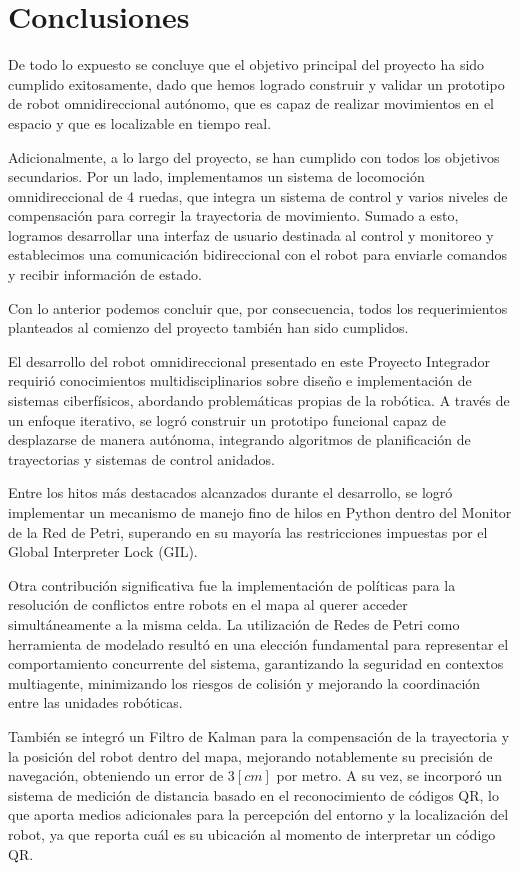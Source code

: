 \chapter{Conclusiones}

De todo lo expuesto se concluye que el objetivo principal del proyecto ha sido cumplido exitosamente, dado que hemos logrado construir y validar un prototipo de robot omnidireccional autónomo, que es capaz de realizar movimientos en el espacio y que es localizable en tiempo real.

Adicionalmente, a lo largo del proyecto, se han cumplido con todos los objetivos secundarios. Por un lado, implementamos un sistema de locomoción omnidireccional de 4 ruedas, que integra un sistema de control y varios niveles de compensación para corregir la trayectoria de movimiento. Sumado a esto, logramos desarrollar una interfaz de usuario destinada al control y monitoreo y establecimos una comunicación bidireccional con el robot para enviarle comandos y recibir información de estado.

Con lo anterior podemos concluir que, por consecuencia, todos los requerimientos planteados al comienzo del proyecto también han sido cumplidos.

El desarrollo del robot omnidireccional presentado en este Proyecto Integrador requirió conocimientos multidisciplinarios sobre diseño e implementación de sistemas ciberfísicos, abordando problemáticas propias de la robótica. A través de un enfoque iterativo, se logró construir un prototipo funcional capaz de desplazarse de manera autónoma, integrando algoritmos de planificación de trayectorias y sistemas de control anidados.

Entre los hitos más destacados alcanzados durante el desarrollo, se logró implementar un mecanismo de manejo fino de hilos en Python dentro del Monitor de la Red de Petri, superando en su mayoría las restricciones impuestas por el Global Interpreter Lock (GIL).

Otra contribución significativa fue la implementación de políticas para la resolución de conflictos entre robots en el mapa al querer acceder simultáneamente a la misma celda. La utilización de Redes de Petri como herramienta de modelado resultó en una elección fundamental para representar el comportamiento concurrente del sistema, garantizando la seguridad en contextos multiagente, minimizando los riesgos de colisión y mejorando la coordinación entre las unidades robóticas.

También se integró un Filtro de Kalman para la compensación de la trayectoria y la posición del robot dentro del mapa, mejorando notablemente su precisión de navegación, obteniendo un error de $3[cm]$ por metro. A su vez, se incorporó un sistema de medición de distancia basado en el reconocimiento de códigos QR, lo que aporta medios adicionales para la percepción del entorno y la localización del robot, ya que reporta cuál es su ubicación al momento de interpretar un código QR.

